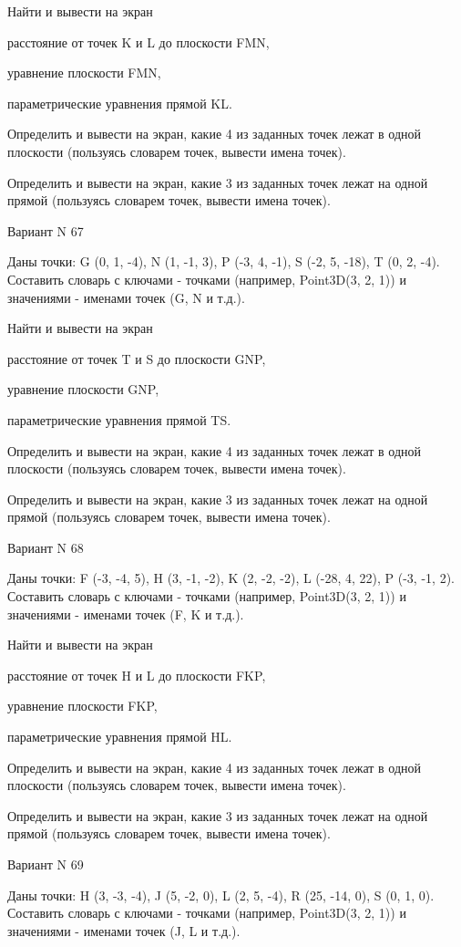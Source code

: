 \documentclass[11pt]{report}
\begin{document}
Найти и вывести на экран


расстояние от точек K и L до плоскости FMN,


уравнение плоскости FMN,


параметрические уравнения прямой KL.


Определить и вывести на экран, какие 4 из заданных точек лежат в одной плоскости (пользуясь словарем точек, вывести имена точек).


Определить и вывести на экран, какие 3 из заданных точек лежат на одной прямой (пользуясь словарем точек, вывести имена точек).

\newpage
Вариант N 67

Даны точки: G (0, 1, -4), N (1, -1, 3), P (-3, 4, -1), S (-2, 5, -18), T (0, 2, -4).
Составить словарь с ключами - точками (например, Point3D(3, 2, 1)) и значениями - именами точек (G, N и т.д.).


Найти и вывести на экран


расстояние от точек T и S до плоскости GNP,


уравнение плоскости GNP,


параметрические уравнения прямой TS.


Определить и вывести на экран, какие 4 из заданных точек лежат в одной плоскости (пользуясь словарем точек, вывести имена точек).


Определить и вывести на экран, какие 3 из заданных точек лежат на одной прямой (пользуясь словарем точек, вывести имена точек).

\newpage
Вариант N 68

Даны точки: F (-3, -4, 5), H (3, -1, -2), K (2, -2, -2), L (-28, 4, 22), P (-3, -1, 2).
Составить словарь с ключами - точками (например, Point3D(3, 2, 1)) и значениями - именами точек (F, K и т.д.).


Найти и вывести на экран


расстояние от точек H и L до плоскости FKP,


уравнение плоскости FKP,


параметрические уравнения прямой HL.


Определить и вывести на экран, какие 4 из заданных точек лежат в одной плоскости (пользуясь словарем точек, вывести имена точек).


Определить и вывести на экран, какие 3 из заданных точек лежат на одной прямой (пользуясь словарем точек, вывести имена точек).

\newpage
Вариант N 69

Даны точки: H (3, -3, -4), J (5, -2, 0), L (2, 5, -4), R (25, -14, 0), S (0, 1, 0).
Составить словарь с ключами - точками (например, Point3D(3, 2, 1)) и значениями - именами точек (J, L и т.д.).
\end{document}
